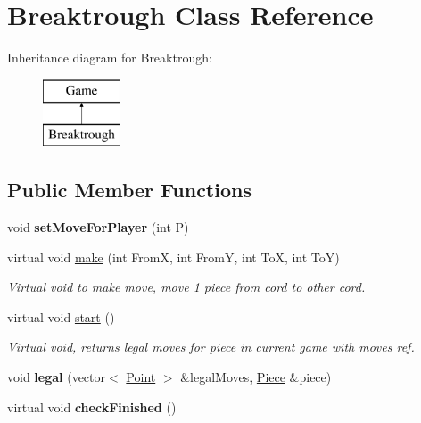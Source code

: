\hypertarget{class_breaktrough}{\section{Breaktrough Class Reference}
\label{class_breaktrough}
}
Inheritance diagram for Breaktrough\-:\begin{figure}[H]
\begin{center}
\leavevmode
\includegraphics[height=2.000000cm]{class_breaktrough}
\end{center}
\end{figure}
\subsection*{Public Member Functions}
\begin{DoxyCompactItemize}
\item 
\hypertarget{class_breaktrough_a1e1244669a6ab63043329afcdaaeec37}{void {\bfseries set\-Move\-For\-Player} (int P)}\label{class_breaktrough_a1e1244669a6ab63043329afcdaaeec37}

\item 
\hypertarget{class_breaktrough_a07006aa5d9919ddefa68554f3022afc6}{virtual void \hyperlink{class_breaktrough_a07006aa5d9919ddefa68554f3022afc6}{make} (int From\-X, int From\-Y, int To\-X, int To\-Y)}\label{class_breaktrough_a07006aa5d9919ddefa68554f3022afc6}

\begin{DoxyCompactList}\small\item\em Virtual void to make move, move 1 piece from cord to other cord. \end{DoxyCompactList}\item 
virtual void \hyperlink{class_breaktrough_a1e4b2c80e074f7052c4c491abe95c9f6}{start} ()
\begin{DoxyCompactList}\small\item\em Virtual void, returns legal moves for piece in current game with moves ref. \end{DoxyCompactList}\item 
\hypertarget{class_breaktrough_a6bf5d444ace61244df9a0255fde5d533}{void {\bfseries legal} (vector$<$ \hyperlink{struct_point}{Point} $>$ \&legal\-Moves, \hyperlink{class_piece}{Piece} \&piece)}\label{class_breaktrough_a6bf5d444ace61244df9a0255fde5d533}

\item 
\hypertarget{class_breaktrough_ae9e5edbac2c2fcce47711697eb3a8a2d}{virtual void {\bfseries check\-Finished} ()}\label{class_breaktrough_ae9e5edbac2c2fcce47711697eb3a8a2d}

\end{DoxyCompactItemize}
